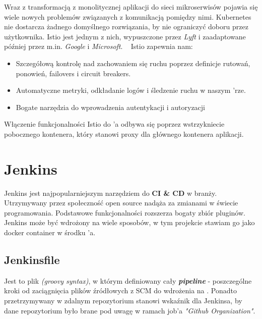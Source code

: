 Wraz z transformacją z monolitycznej aplikacji do sieci mikroserwisów pojawia się wiele nowych problemów związanych z komunikacją pomiędzy nimi.
Kubernetes nie dostarcza żadnego domyślnego rozwiązania, by nie ograniczyć doboru przez użytkownika.
Istio jest jednym z nich, wypuszczone przez \emph{Lyft} i zaadaptowane później przez m.in. \emph{Google} i \emph{Microsoft}. ~\cite{istio-what}
Istio zapewnia nam:

\begin{itemize}
    \item
    Szczegółową kontrolę nad zachowaniem się ruchu poprzez definicje rutowań, ponowień, failovers i circuit breakers.
    
    \item
    Automatyczne metryki, odkładanie logów i śledzenie ruchu w naszym 'rze.

    \item
    Bogate narzędzia do wprowadzenia autentykacji i autoryzacji
    
\end{itemize} 

Włączenie funkcjonalności Istio do 'a odbywa się poprzez wstrzykniecie pobocznego kontenera, 
który stanowi proxy dla głównego kontenera aplikacji.

\section{Jenkins}

Jenkins jest najpopularniejszym narzędziem do \textbf{CI \& CD} w branży. 
Utrzymywany przez społeczność open source nadąża za zmianami w świecie programowania.
Podstawowe funkcjonalności rozszerza bogaty zbiór pluginów.
Jenkins może być wdrożony na wiele sposobów, w tym projekcie stawiam go jako docker container w środku 'a. 

\subsection{Jenkinsfile}
Jest to plik \emph{(groovy syntax)}, w którym definiowany cały \textbf{\emph{pipeline}} - poszczególne kroki od zaciągnięcia plików źródłowych z SCM do wdrożenia na .
Ponadto przetrzymywany w zdalnym repozytorium stanowi wskaźnik dla Jenkinsa, by dane repozytorium było brane pod uwagę w ramach job'a \emph{"Github Organization"}.

